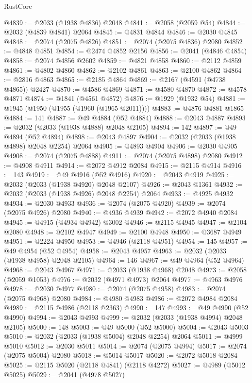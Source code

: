 \begin{lexlean}{RustCore}
\begin{coremodule}
@4839 := @2033 (@1938 @4836) @2048
@4841 := @2058 (@2059 @54)
@4844 := @2032 (@4839 @4841) @2064
@4845 := @4831 @4844
@4846 := @2030 @4845
@4848 := @2074 (@2075 @4826)
@4851 := @2074 (@2075 @4836) @2080
@4852 := @4848 @4851
@4854 := @2474 @4852 @2156
@4856 := @2041 (@4846 @4854)
@4858 := @2074 @4856 @2602
@4859 := @4821 @4858
@4860 := @2112 @4859
@4861 := @4802 @4860
@4862 := @2102 @4861
@4863 := @2100 @4862
@4864 := @2816 @4863
@4865 := @2185 @4864
@4869 := @2167 (@4591 (@4738 @4865)) @2427
@4870 := @4586 @4869
@4871 := @4580 @4870
@4872 := @4578 @4871
@4874 := @1841 (@4561 @4872)
@4876 := @1929 (@1932 @54)
@4881 := @1945 (@1950 (@1955 (@1960 (@1965 @2011))))
@4883 := @4876 @4881 @1865
@4884 := 141
@4887 := @49 @4884 (@52 @4884)
@4888 := @2043 @4887
@4893 := @2032 (@2033 (@1938 @4888) @2048 @2105)
@4894 := 142
@4897 := @49 @4894 (@52 @4894)
@4898 := @2043 @4897
@4904 := @2032 (@2033 (@1938 @4898) @2048 @2254) @2064
@4905 := @4893 @4904
@4906 := @2030 @4905
@4908 := @2074 (@2075 @4888)
@4911 := @2074 (@2075 @4898) @2080
@4912 := @4908 @4911
@4914 := @2072 @4912 @2084
@4915 := @2115 @4914
@4916 := 143
@4919 := @49 @4916 (@52 @4916)
@4920 := @2043 @4919
@4925 := @2032 (@2033 (@1938 @4920) @2048 @2107)
@4926 := @2043 @1361
@4932 := @2032 (@2033 (@1938 @4926) @2048 @2254) @2064
@4933 := @4925 @4932
@4934 := @2030 @4933
@4936 := @2074 (@2075 @4920)
@4939 := @2074 (@2075 @4926) @2080
@4940 := @4936 @4939
@4942 := @2072 @4940 @2084
@4945 := @4915 (@4934 @4942) @3002
@4946 := @2115 @4945
@4947 := @2104 @2080
@4948 := @2102 @4947
@4949 := @2100 @4948
@4950 := @3687 @4949
@4951 := @2224 @4950
@4953 := @4946 (@2118 @4951)
@4954 := 145
@4957 := @49 @4954 (@52 @4954)
@4958 := @2043 @4957
@4963 := @2032 (@2033 (@1938 @4958) @2048 @2105)
@4964 := 146
@4967 := @49 @4964 (@52 @4964)
@4968 := @2043 @4967
@4971 := @2033 (@1938 @4968) @2048
@4973 := @2058 (@2059 @1053)
@4976 := @2032 (@4971 @4973) @2064
@4977 := @4963 @4976
@4978 := @2030 @4977
@4980 := @2074 (@2075 @4958)
@4983 := @2074 (@2075 @4968) @2080
@4984 := @4980 @4983
@4986 := @2072 @4984 @2084
@4989 := @2115 @4986 (@2118 @2363)
@4990 := 147
@4993 := @49 @4990 (@52 @4990)
@4994 := @2043 @4993
@4999 := @2032 (@2033 (@1938 @4994) @2048 @2105)
@5000 := 148
@5003 := @49 @5000 (@52 @5000)
@5004 := @2043 @5003
@5010 := @2032 (@2033 (@1938 @5004) @2048 @2254) @2064
@5011 := @4999 @5010
@5012 := @2030 @5011
@5014 := @2074 (@2075 @4994)
@5017 := @2074 (@2075 @5004) @2080
@5018 := @5014 @5017
@5020 := @2072 @5018 @2084
@5025 := @2115 @5020 (@2118 @4841) (@2118 @4272)
@5027 := @4989 (@5012 @5025)
@5029 := @2041 (@4978 @5027)

\end{coremodule}
\end{lexlean}
